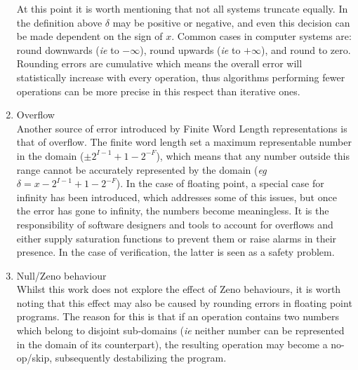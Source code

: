 \documentclass[runningheads,a4paper]{llncs}
\begin{document}
\begin{enumerate}
At this point it is worth mentioning that not all systems truncate equally. In the definition above $\delta$ may be positive
or negative, and even this decision can be made dependent on the sign of $x$. Common cases in computer systems are:
round downwards (\emph{ie} to $-\infty$), round upwards (\emph{ie} to $+\infty$), and round to zero.
Rounding errors are cumulative which means the overall error will statistically increase with every operation, thus algorithms
performing fewer operations can be more precise in this respect than iterative ones. 
\item Overflow\\
Another source of error introduced by Finite Word Length representations is that of overflow. The finite word length set a
maximum representable number in the domain ($\pm 2^{I-1}+1-2^{-F}$), which means that any number outside this range
cannot be accurately represented by the domain (\emph{eg} $\delta=x-2^{I-1}+1-2^{-F}$). In the case of floating point, a special
case for infinity has been introduced, which addresses some of this issues, but once the error has gone to infinity, the numbers
become meaningless. It is the responsibility of software designers and tools to account for overflows and either supply saturation
functions to prevent them or raise alarms in their presence. In the case of verification, the latter is seen as a safety problem.
\item Null/Zeno behaviour\\
Whilst this work does not explore the effect of Zeno behaviours, it is worth noting that this effect may also be caused by rounding
errors in floating point programs. The reason for this is that if an operation contains two numbers which belong to disjoint sub-domains
(\emph{ie} neither number can be represented in the domain of its counterpart), the resulting operation may become a no-op/skip,
subsequently destabilizing the program.
\end{enumerate}

\end{document}
